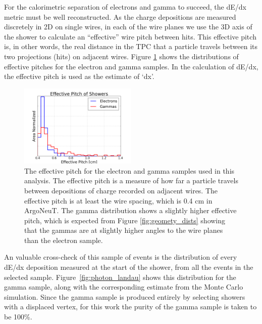 For the calorimetric separation of electrons and gamma to succeed, the dE/dx metric must be well reconstructed. As the charge depositions are measured discretely in 2D on single wires, in each of the wire planes we use the 3D axis of the shower to calculate an ``effective'' wire pitch between hits.  This effective pitch is, in other words, the real distance in the TPC that a particle travels between its two projections (hits) on adjacent wires. Figure \ref{fig:effective_pitch} shows the distributions of effective pitches for the electron and gamma samples.  In the calculation of dE/dx, the effective pitch is used as the estimate of `dx'.

\begin{figure}[p]
  \centering
  \includegraphics[width=0.5\textwidth]{emshower_figures/effective_pitch.png}
  \caption[Effective Pitch]{The effective pitch for the electron and gamma samples used in this analysis.  The effective pitch is a measure of how far a particle travels between depositions of charge recorded on adjacent wires.  The effective pitch is at least the wire spacing, which is 0.4 cm in ArgoNeuT.  The gamma distribution shows a slightly higher effective pitch, which is expected from Figure \ref{fig:geomety_dists} showing that the gammas are at slightly higher angles to the wire planes than the electron sample.}
  \label{fig:effective_pitch}
\end{figure}

An valuable cross-check of this sample of events is the distribution of every dE/dx deposition measured at the start of the shower, from all the events in the selected sample.  Figure~\ref{fig:photon_landau} shows this distribution for the gamma sample, along with the corresponding estimate from the Monte Carlo simulation.  Since the gamma sample is produced entirely by selecting showers with a displaced vertex, for this work the purity of the gamma sample is taken to be 100\%.

